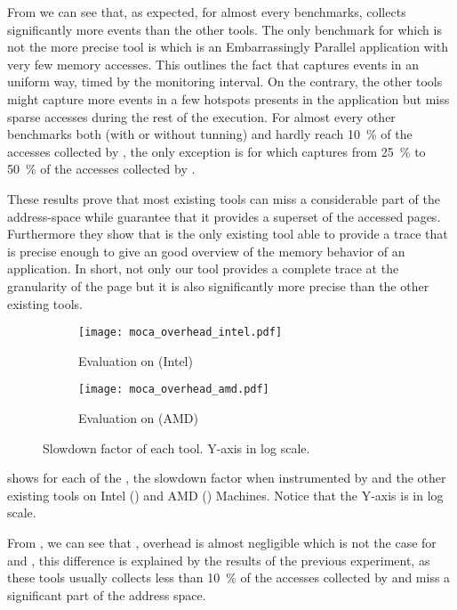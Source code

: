 From  we can see that, as expected, for almost every benchmarks,
\Moca collects significantly more events than the other tools.  The only
benchmark for which \Moca is not the more precise tool is \EP which is an
Embarrassingly Parallel application with very few memory accesses.
This outlines the fact that \Moca captures events in an uniform way, timed by the monitoring interval.
On the contrary, the other tools might capture more events in a few hotspots presents in the application but miss
sparse accesses during the rest of the execution.
For almost
every other benchmarks both \Mitos (with or without tunning) and \MemProf
hardly reach \SI{10}{\%} of the accesses collected by \Moca, the only exception is
\DC for which \MemProf captures from \SI{25}{\%} to \SI{50}{\%} of the accesses
collected by \Moca.

These results prove that most existing tools can miss a considerable part of
the address-space while \Moca guarantee that it provides a superset of the accessed
pages. Furthermore they show that \Moca is the only existing tool able to provide a
trace that is precise enough to give an good overview of the memory behavior of an application. In
short, not only our tool provides a complete trace at the granularity of the
page but it is also significantly more precise than the other existing tools.

\begin{figure}[htb]
    \centering
    \begin{subfigure}{\linewidth}
        \texttt{[image: moca\_overhead\_intel.pdf]}
        \caption{Evaluation on \Edel (Intel)}
        \label{fig:ovh-Intel}
    \end{subfigure}
    \begin{subfigure}{\linewidth}
        \texttt{[image: moca\_overhead\_amd.pdf]}
        \caption{Evaluation on \Stremi (AMD)}
        \label{fig:ovh-AMD}
    \end{subfigure}
    \caption{Slowdown factor of each tool.
    Y-axis in log scale.}
    \label{fig:ovh}
\end{figure}

 shows for each of the \NPB, the slowdown factor when
instrumented by \Moca and the other existing tools on Intel
() and AMD () Machines. Notice that the Y-axis is in
log scale.

From , we can see that \Mitos, \MitosTun overhead is
almost negligible which is not the case for \Moca and \TABARNAC, this
difference is explained by the results of the previous experiment, as these
tools usually collects less than \SI{10}{\%} of the accesses collected by \Moca and
miss a significant part of the address space.

